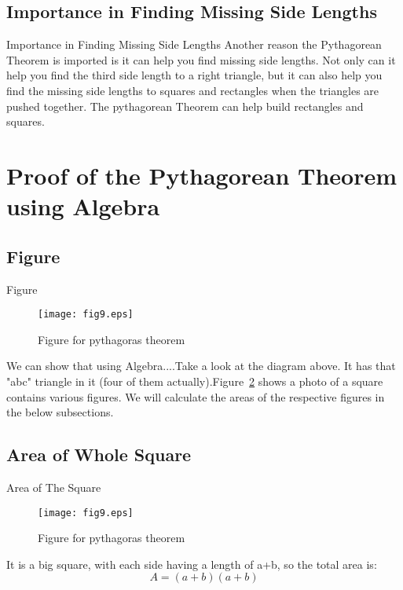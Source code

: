 \documentclass[10pt]{beamer}
\begin{document}
\subsection{Importance in Finding Missing Side Lengths}
\begin{frame}{Importance in Finding Missing Side Lengths}
\transfade
Another reason the Pythagorean Theorem is imported is it can help you find missing side lengths. Not only can it help you find the third side length to a right triangle, but it can also help you find the missing side lengths to squares and rectangles when the triangles are pushed together. The pythagorean Theorem can help build rectangles and squares.
\end{frame}

\section{Proof of the Pythagorean Theorem using Algebra}
\label{sec:proof}
\subsection{Figure}
\begin{frame}{Figure}
\begin{figure}[htb!]
  \begin{center}
    \texttt{[image: fig9.eps]}
   \end{center}
  \caption{Figure for pythagoras theorem}
  \label{image1}
\end{figure}
We can show that using Algebra....Take a look at the diagram above. It has that "abc" triangle in it (four of them actually).Figure~\ref{image1} shows a photo of a square contains various figures. We will calculate the areas of the respective figures in the below subsections.
\transfade
\end{frame}

\subsection{Area of Whole Square}
\label{a_square}
\begin{frame}{Area of The Square}
\begin{figure}[htb!]
  \begin{center}
    \texttt{[image: fig9.eps]}
   \end{center}
  \caption{Figure for pythagoras theorem}
  \label{image1}
\end{figure}
\transfade
It is a big square, with each side having a length of a+b, so the total area is:
$$A = (a+b)(a+b)$$
\end{frame}
\end{document}

